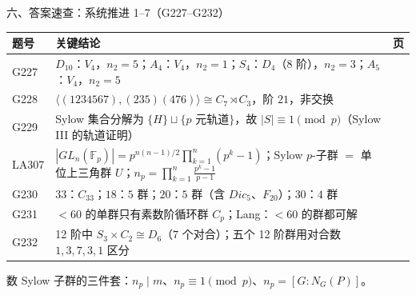 \documentclass[aspectratio=169,10pt,fontset=none]{ctexbeamer}
\begin{document}
\begin{frame}[t]{六、答案速查：系统推进 1--7（G227--G232）}
  \centering
  \scriptsize
  \setlength{\tabcolsep}{3pt}
  \renewcommand{\arraystretch}{1.18}
  \begin{tabular}{@{}l p{10.0cm} c@{}}
    \toprule
    题号 & 关键结论 & 页\\
    \midrule
    G227 & $D_{10}$：$V_4$，$n_2=5$；$A_4$：$V_4$，$n_2=1$；$S_4$：$D_4$（$8$ 阶），$n_2=3$；$A_5$：$V_4$，$n_2=5$ & \pageref{ex:G227}\\
    G228 & $\langle(1234567),(235)(476)\rangle\cong C_7\rtimes C_3$，阶 $21$，非交换 & \pageref{ex:G228}\\
    G229 & Sylow 集合分解为 $\{H\}\sqcup\{p\text{ 元轨道}\}$，故 $|S|\equiv1\pmod p$（Sylow III 的轨道证明） & \pageref{ex:G229}\\
    LA307 & $|GL_n(\mathbb F_p)|=p^{n(n-1)/2}\prod_{k=1}^n(p^k-1)$；Sylow $p$-子群 $=$ 单位上三角群 $U$；$n_p=\prod_{k=1}^n\frac{p^k-1}{p-1}$ & \pageref{ex:LA307}\\
    G230 & $33$：$C_{33}$；$18$：$5$ 群；$20$：$5$ 群（含 $Dic_5$、$F_{20}$）；$30$：$4$ 群 & \pageref{ex:G230}\\
    G231 & $<60$ 的单群只有素数阶循环群 $C_p$；Lang：$<60$ 的群都可解 & \pageref{ex:G231}\\
    G232 & 12 阶中 $S_3\times C_2\cong D_6$（$7$ 个对合）；五个 12 阶群用对合数 $1,3,7,3,1$ 区分 & \pageref{ex:G232}\\
    \bottomrule
  \end{tabular}
  \par
  \vspace{0.3em}
  {\scriptsize\color{ink!70} 数 Sylow 子群的三件套：$n_p\mid m$、$n_p\equiv1\pmod p$、$n_p=[G:N_G(P)]$。}
\end{frame}
\end{document}
